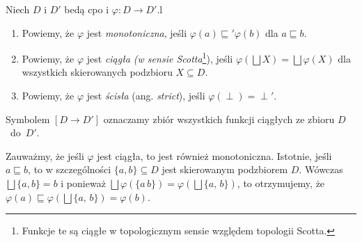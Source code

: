 \begin{definicja}\label{def:m_cont}%
Niech \(D\) i \(D'\) bedą cpo i \(\varphi: D\to D'\).l
\begin{enumerate}[label={(\alph*)}, ref={(\alph*)}] 
  \setlength\itemsep{0em}
\item Powiemy, że \(\varphi\) jest \emph{monotoniczna}, jeśli \(\varphi(a) \sqsubseteq' \varphi(b)\) dla \(a\sqsubseteq b\).
\item Powiemy, że \(\varphi\) jest \emph{ciągła (w sensie Scotta}\footnote{Funkcje te są ciągłe w topologicznym sensie względem topologii Scotta.}), jeśli \(\varphi(\bigsqcup X) = \bigsqcup \varphi (X)\) dla wszystkich skierowanych podzbioru \(X\subseteq D\).\label{def:m_cont_2}
\item Powiemy, że \(\varphi\) jest \emph{ścisła} (ang. \emph{strict}), jeśli \(\varphi(\perp)=\perp'\).
\end{enumerate}
Symbolem \([D\to D']\) oznaczamy zbiór wszystkich funkcji ciągłych ze zbioru \(D\)~do~\(D'\).
\end{definicja}

\begin{uwaga*}
Zauważmy, że jeśli \(\varphi\) jest ciągła, to jest również monotoniczna. Istotnie, jeśli \(a\sqsubseteq b\), to w szczególności \(\{a, b\}\subseteq D\) jest skierowanym podzbiorem \(D\). Wówczas \(\bigsqcup\{a, b\}=b\) i ponieważ \(\bigsqcup \varphi(\{a\,b\})=\varphi(\bigsqcup\{a,\,b\})\), to otrzymujemy, że \(\varphi(a)\sqsubseteq \varphi(\bigsqcup\{a,\,b\}) = \varphi(b)\).
\end{uwaga*}

